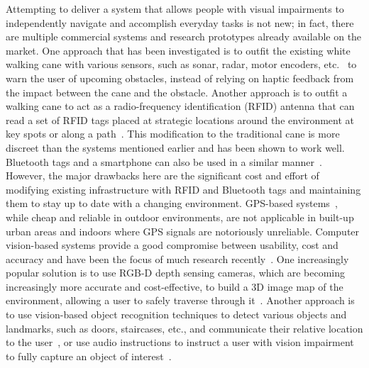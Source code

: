 \documentclass[sigconf, screen=true, anonymous=true]{acmart}
\begin{document}
Attempting to deliver a system that allows people with visual impairments to independently navigate and accomplish everyday tasks is not new; in fact, there are multiple commercial systems and research prototypes already available on the market.
One approach that has been investigated is to outfit the existing white walking cane with various sensors,
such as sonar, radar, motor encoders, etc.~\cite{ulrich1997, marion2008batcane} to warn the user of upcoming obstacles, instead of relying on haptic feedback from the impact between the cane and the obstacle.
Another approach is to outfit a walking cane to act as a radio-frequency identification (RFID) antenna that can read a set of RFID tags placed at strategic locations around the environment at key spots or along a path~\cite{faria2010electronic, willis2005}.
This modification to the traditional cane is more discreet than the systems mentioned earlier and has been shown to work well.
Bluetooth tags and a smartphone can also be used in a similar manner~\cite{sato2017navcog3}.
However, the major drawbacks here are the significant cost and effort of modifying existing infrastructure with RFID and Bluetooth tags and maintaining them to stay up to date with a changing environment.
GPS-based systems~\cite{ran2004drishti, loomis2001navigating, kammoun2012navigation}, while cheap and reliable in outdoor environments, are not applicable in built-up urban areas and indoors where GPS signals are notoriously unreliable.
Computer vision-based systems provide a good compromise between usability, cost and accuracy and have been the focus of much research recently~\cite{manduchi2014last}.
One increasingly popular solution is to use RGB-D depth sensing cameras, which are becoming increasingly more accurate and cost-effective, to build a 3D image map of the environment, allowing a user to safely traverse through it~\cite{lee2015, rodriguez2012obstacle}.
Another approach is to use vision-based object recognition techniques to detect various objects and landmarks, such as doors, staircases, etc., and communicate their relative location to the user~\cite{schauerte2012assistive, tian2013b, fiannaca2014headlock}, or use audio instructions to instruct a user with vision impairment to fully capture an object of interest~\cite{vazquez2012helping}. 
\end{document}
